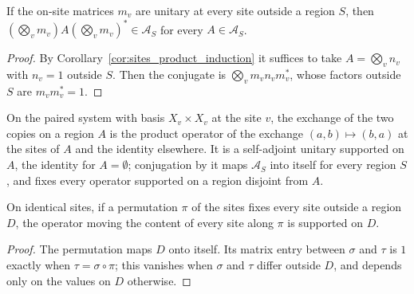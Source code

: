 \begin{lemma}
    \label{lem:sites_onsite_conjugation}
    \leanok
    If the on-site matrices $m_v$ are unitary at every site outside a region $S$, then
    $(\bigotimes_vm_v)A(\bigotimes_vm_v)^*\in\mathcal A_S$ for every $A\in\mathcal A_S$.
\end{lemma}
\begin{proof}\leanok
    By Corollary~\ref{cor:sites_product_induction} it suffices to take
    $A=\bigotimes_vn_v$ with $n_v=1$ outside $S$. Then the conjugate is
    $\bigotimes_vm_vn_vm_v^*$, whose factors outside $S$ are $m_vm_v^*=1$.
\end{proof}

\begin{definition}
    \label{def:sites_pair_swap}
    \leanok
    On the paired system with basis $X_v\times X_v$ at the site $v$, the exchange of the two
    copies on a region $A$ is the product operator of the exchange $(a,b)\mapsto(b,a)$ at the
    sites of $A$ and the identity elsewhere. It is a self-adjoint unitary supported on $A$,
    the identity for $A=\emptyset$; conjugation by it maps $\mathcal A_S$ into itself for
    every region $S$, and fixes every operator supported on a region disjoint from $A$.
\end{definition}

\begin{theorem}
    \label{thm:sites-local-permutation}
    \leanok
    On identical sites, if a permutation $\pi$ of the sites fixes every site outside
    a region $D$, the operator moving the content of every site along $\pi$ is
    supported on $D$.
\end{theorem}
\begin{proof}
    \leanok
    The permutation maps $D$ onto itself. Its matrix entry between $\sigma$ and
    $\tau$ is $1$ exactly when $\tau=\sigma\circ\pi$; this vanishes when $\sigma$
    and $\tau$ differ outside $D$, and depends only on the values on $D$ otherwise.
\end{proof}

